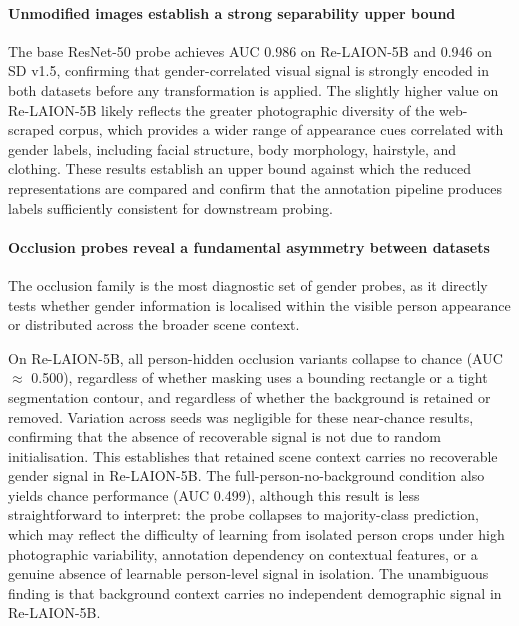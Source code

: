 \paragraph{Unmodified images establish a strong separability upper bound}

The base ResNet-50 probe achieves AUC 0.986 on Re-LAION-5B and 0.946 on SD v1.5, confirming that gender-correlated visual signal is strongly encoded in both datasets before any transformation is applied. The slightly higher value on Re-LAION-5B likely reflects the greater photographic diversity of the web-scraped corpus, which provides a wider range of appearance cues correlated with gender labels, including facial structure, body morphology, hairstyle, and clothing. These results establish an upper bound against which the reduced representations are compared and confirm that the annotation pipeline produces labels sufficiently consistent for downstream probing.

\paragraph{Occlusion probes reveal a fundamental asymmetry between datasets}

The occlusion family is the most diagnostic set of gender probes, as it directly tests whether gender information is localised within the visible person appearance or distributed across the broader scene context.

On Re-LAION-5B, all person-hidden occlusion variants collapse to chance (AUC $\approx$ 0.500), regardless of whether masking uses a bounding rectangle or a tight segmentation contour, and regardless of whether the background is retained or removed. Variation across seeds was negligible for these near-chance results, confirming that the absence of recoverable signal is not due to random initialisation. This establishes that retained scene context carries no recoverable gender signal in Re-LAION-5B. The full-person-no-background condition also yields chance performance (AUC 0.499), although this result is less straightforward to interpret: the probe collapses to majority-class prediction, which may reflect the difficulty of learning from isolated person crops under high photographic variability, annotation dependency on contextual features, or a genuine absence of learnable person-level signal in isolation. The unambiguous finding is that background context carries no independent demographic signal in Re-LAION-5B.

